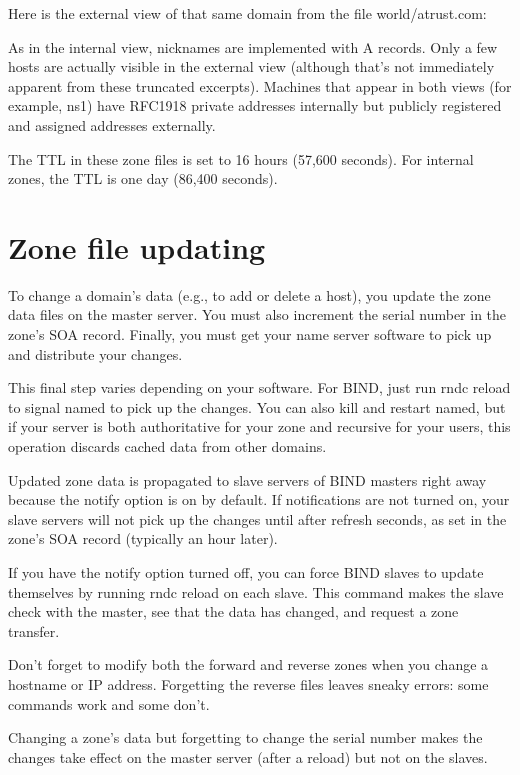 Here is the external view of that same domain from the file
{world/atrust.com}:


As in the internal view, nicknames are implemented with A records. Only
a few hosts are actually visible in the external view (although that's
not immediately apparent from these truncated excerpts). Machines that
appear in both views (for example, ns1) have RFC1918 private addresses
internally but publicly registered and assigned addresses externally.

The TTL in these zone files is set to 16 hours (57,600 seconds). For
internal zones, the TTL is one day (86,400 seconds).




\section{Zone file updating}

To change a domain's data (e.g., to add or delete a host), you update
the zone data files on the master server. You must also increment the
serial number in the zone's SOA record. Finally, you must get your name
server software to pick up and distribute your changes.

This final step varies depending on your software. For BIND, just run
{rndc} {reload }to signal {named} to pick up the changes. You can also
kill and restart {named}, but if your server is both authoritative for
your zone and recursive for your users, this operation discards cached
data from other domains.

Updated zone data is propagated to slave servers of BIND masters right
away because the {notify} option is on by default. If notifications are
not turned on, your slave servers will not pick up the changes until
after {refresh} seconds, as set in the zone's SOA record (typically an
hour later).

If you have the {notify} option turned off, you can force BIND slaves to
update themselves by running {rndc reload} on each slave. This command
makes the slave check with the master, see that the data has changed,
and request a zone transfer.

Don't forget to modify both the forward and reverse zones when you
change a hostname or IP address. Forgetting the reverse files leaves
sneaky errors: some commands work and some don't.

Changing a zone's data but forgetting to change the serial number makes
the changes take effect on the master server (after a reload) but not on
the slaves.

